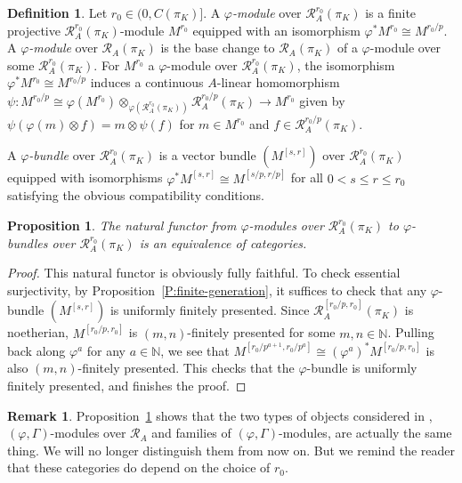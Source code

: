 \documentclass[12pt]{article}
\newtheorem{prop}[theorem]{Proposition}
\theoremstyle{definition}
\newtheorem{defn}[theorem]{Definition}
\newtheorem{remark}[theorem]{Remark}
\numberwithin{equation}{theorem}
\newcommand{\calR}{\mathcal{R}}
\newcommand{\NN}{\mathbb{N}}
\begin{document}
\begin{defn}
Let $r_0 \in (0, C(\pi_K)]$.  A \emph{$\varphi$-module} over
  $\calR^{r_0}_A(\pi_K)$ is a finite projective
  $\calR^{r_0}_A(\pi_K)$-module $M^{r_0}$ equipped with an isomorphism
  $\varphi^* M^{r_0} \cong M^{r_0/p}$.  A \emph{$\varphi$-module} over
  $\calR_A(\pi_K)$ is the base change to $\calR_A(\pi_K)$ of a
  $\varphi$-module over some $\calR^{r_0}_A(\pi_K)$.  For $M^{r_0}$ a
  $\varphi$-module over $\calR_A^{r_0}(\pi_K)$, the isomorphism
  $\varphi^* M^{r_0} \cong M^{r_0/p}$ induces a continuous $A$-linear
  homomorphism $\psi: M^{r_0/p} \cong \varphi (M^{r_0})
  \otimes_{\varphi(\calR_A^{r_0}(\pi_K))} \calR_A^{r_0/p}(\pi_K) \to
  M^{r_0}$ given by $\psi(\varphi(m) \otimes f) = m \otimes \psi(f)$
  for $m \in M^{r_0}$ and $f \in \calR_A^{r_0/p}(\pi_K)$.

A \emph{$\varphi$-bundle} over $\calR_A^{r_0}(\pi_K)$ is a vector bundle $(M^{[s,r]})$ over $\calR_A^{r_0}(\pi_K)$ equipped with  isomorphisms $\varphi^*M^{[s,r]} \cong M^{[s/p, r/p]}$ for all $0 < s \leq r \leq r_0$ satisfying the obvious compatibility conditions.
\end{defn}


\begin{prop}
\label{P:phi module v.s. phi bundle}
The natural functor from  $\varphi$-modules over $\calR^{r_0}_A(\pi_K)$ to  $\varphi$-bundles over $\calR_A^{r_0}(\pi_K)$ is an equivalence of categories.
\end{prop}
\begin{proof}
This natural functor is obviously fully faithful.  To check essential surjectivity, by Proposition~\ref{P:finite-generation}, it suffices to check that  any $\varphi$-bundle $(M^{[s,r]})$ is uniformly finitely presented.  Since $\calR_A^{[r_0/p, r_0]}(\pi_K)$ is noetherian, $M^{[r_0/p, r_0]}$ is $(m,n)$-finitely presented for some $m,n \in \NN$.  Pulling back along $\varphi^a$ for any $a\in\NN$, we see that $M^{[r_0/p^{a+1}, r_0/p^a]} \cong (\varphi^a)^* M^{[r_0/p, r_0]}$ is also $(m,n)$-finitely presented.  This checks that the $\varphi$-bundle is uniformly finitely presented, and finishes the proof.
\end{proof}

\begin{remark}
Proposition~\ref{P:phi module v.s. phi bundle}
 shows that the two types of objects considered in \cite{kiran-liu}, $(\varphi, \Gamma)$-modules over $\calR_A$ and families of $(\varphi, \Gamma)$-modules, are actually the same thing.  We will no longer distinguish them from now on.  But we remind the reader that these categories do depend on the choice of $r_0$.
\end{remark}
\end{document}
